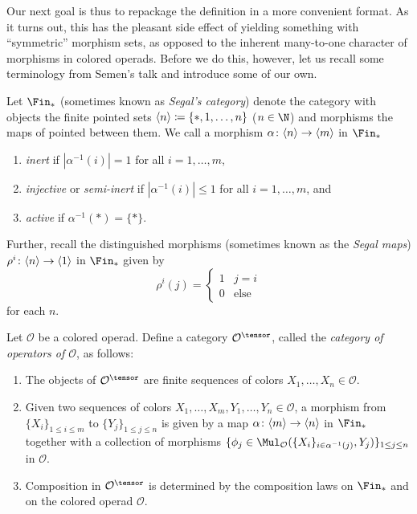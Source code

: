 \documentclass[topology]{bsteffan-notes}
\newcommand{\cO}{{\mathcal{O}}}
\DeclarePairedDelimiter{\FSn}{\langle}{\rangle}
\begin{document}
Our next goal is thus to repackage the definition in a more convenient format.
As it turns out, this has the pleasant side effect of yielding something with \enquote{symmetric} morphism sets, as opposed to the inherent many-to-one character of morphisms in colored operads.
Before we do this, however, let us recall some terminology from Semen's talk and introduce some of our own.
\begin{definition}
	Let $\Fin_*$ (sometimes known as \emph{Segal's category}) denote the category with objects the finite pointed sets $\FSn{n} \coloneq \{*, 1, \ldots, n\}$ ($n \in \N$) and morphisms the maps of pointed between them.
	We call a morphism $\alpha\colon \FSn{n} \to \FSn{m}$ in $\Fin_*$
	\begin{enumerate}
		\item \emph{inert} if $|\alpha^{-1}(i)| = 1$ for all $i = 1, \ldots, m$,
		\item \emph{injective} or \emph{semi-inert} if $|\alpha^{-1}(i)| \leq 1$ for all $i = 1, \ldots, m$, and
		\item \emph{active} if $\alpha^{-1}(*) = \{*\}$.
	\end{enumerate}

	Further, recall the distinguished morphisms (sometimes known as the \emph{Segal maps}) $\rho^i\colon \FSn{n} \to \FSn{1}$ in $\Fin_*$ given by 
	\begin{equation*}
		\rho^i(j) = \begin{cases}
			1 & j = i \\
			0 & \text{else}
		\end{cases}
	\end{equation*}
	for each $n$.
\end{definition}
\begin{definition}
	Let $\cO$ be a colored operad.
	Define a category $\cO^\tensor$, called the \emph{category of operators of $\cO$}, as follows:
	\begin{enumerate}
		\item The objects of $\cO^\tensor$ are finite sequences of colors $X_1, \ldots, X_n \in \cO$.
		\item Given two sequences of colors $X_1, \ldots, X_m, Y_1, \ldots, Y_n \in \cO$, a morphism from $\{X_i\}_{1 \leq i \leq m}$ to $\{Y_j\}_{1 \leq j \leq n}$ is given by a map $\alpha\colon \FSn{m} \to \FSn{n}$ in $\Fin_*$ together with a collection of morphisms $\{\phi_j \in \Mul_\cO(\{X_i\}_{i \in \alpha^{-1}(j)}, Y_j)\}_{1 \leq j \leq n}$ in $\cO$.
		\item Composition in $\cO^\tensor$ is determined by the composition laws on $\Fin_*$ and on the colored operad $\cO$.
	\end{enumerate}
\end{definition}
\end{document}
